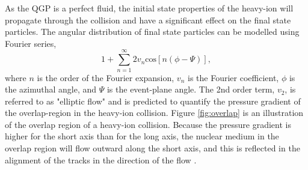 As the QGP is a perfect fluid, the initial state properties of the heavy-ion will propagate through the collision and have a significant effect on the final state particles. The angular distribution of final state particles can be modelled using Fourier series,
\begin{equation}
 1+\sum^{\infty}_{n=1}2v_{n}\mathrm{cos}\left[n\left(\phi-\Psi\right)\right],
\end{equation}
where $n$ is the order of the Fourier expansion, $v_n$ is the Fourier coefficient, $\phi$ is the azimuthal angle, and $\Psi$ is the event-plane angle. The 2nd order term, $v_2$, is referred to as "elliptic flow" and is predicted to quantify the pressure gradient of the overlap-region in the heavy-ion collision. Figure \ref{fig:overlap} is an illustration of the overlap region of a heavy-ion collision. Because the pressure gradient is higher for the short axis than for the long axis, the nuclear medium in the overlap region will flow outward along the short axis, and this is reflected in the alignment of the tracks in the direction of the flow \cite{Abelev:2012ola}\cite{Ollitrault:1992bk}\cite{Sorensen:2009cz}\cite{Bhalerao:2003yq}\cite{Borghini:2001zr}\cite{Ackermann:2000tr}\cite{Borghini:2004ke}. 

